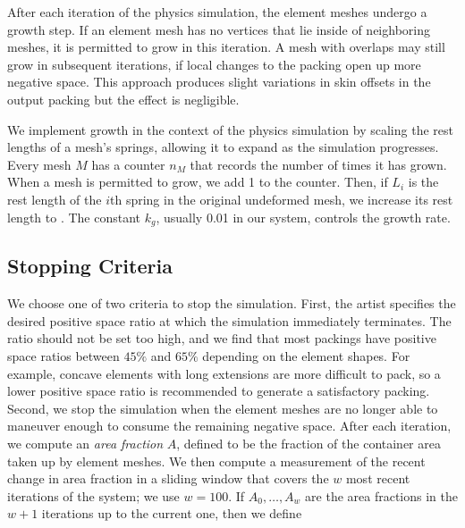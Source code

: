 After each iteration of the physics simulation, the element meshes undergo
a growth step.  If an element mesh has no vertices that lie inside of
neighboring meshes, it is permitted to grow in this iteration.  A mesh with
overlaps may still grow in subsequent iterations, if local changes to the 
packing open up more negative space.
This approach produces slight variations in skin offsets in the output packing
but the effect is negligible.

We implement growth in the context of the physics simulation by scaling
the rest lengths of a mesh's springs, allowing it to expand as the simulation
progresses.  Every mesh $M$ has a counter $n_M$ that records the number of
times it has grown.  When a mesh is permitted
to grow, we add 1 to the counter.  Then, if $L_i$ is the rest length
of the $i$th spring in the original undeformed mesh, we increase its rest
length to .  The constant $k_g$,
usually 0.01 in our system, controls the growth rate.


\subsection{Stopping Criteria}
\label{repulsionpak_stopping_criteria}


We choose one of two criteria to stop the simulation. First, the artist specifies 
the desired positive space ratio at which the simulation immediately terminates.
The ratio should not be set too high, and
we find that most packings have positive space ratios between $45\%$ and $65\%$ depending on the element shapes.
For example, concave elements with long extensions are more difficult to pack, 
so a lower positive space ratio is recommended to generate a satisfactory packing.
Second, we stop the simulation when the element meshes are no longer
able to maneuver enough to consume the remaining negative space. 
After each iteration, we compute an \textit{area fraction} $A$, defined to be the fraction of
the container area taken up by element meshes.  We then compute a measurement
of the recent change in area fraction in a sliding window that covers the $w$
most recent iterations of the system; we use $w=100$.  If $A_0,\ldots,A_w$
are the area fractions in the $w+1$ iterations up to the current one, then we
define

